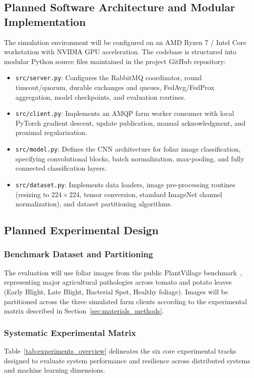 \documentclass[applsci,article,submit,oneauthor,pdftex]{Definitions/mdpi}
\begin{document}
\subsection{Planned Software Architecture and Modular Implementation}
The simulation environment will be configured on an AMD Ryzen 7 / Intel Core workstation with NVIDIA GPU acceleration. The codebase is structured into modular Python source files maintained in the project GitHub repository:
\begin{itemize}[leftmargin=*]
    \item \texttt{src/server.py}: Configures the RabbitMQ coordinator, round timeout/quorum, durable exchanges and queues, FedAvg/FedProx aggregation, model checkpoints, and evaluation routines.
    \item \texttt{src/client.py}: Implements an AMQP farm worker consumer with local PyTorch gradient descent, update publication, manual acknowledgment, and proximal regularization.
    \item \texttt{src/model.py}: Defines the CNN architecture for foliar image classification, specifying convolutional blocks, batch normalization, max-pooling, and fully connected classification layers.
    \item \texttt{src/dataset.py}: Implements data loaders, image pre-processing routines (resizing to $224 \times 224$, tensor conversion, standard ImageNet channel normalization), and dataset partitioning algorithms.
\end{itemize}

\subsection{Planned Experimental Design}

\subsubsection{Benchmark Dataset and Partitioning}
The evaluation will use foliar images from the public PlantVillage benchmark~\cite{mohanty2016using}, representing major agricultural pathologies across tomato and potato leaves (Early Blight, Late Blight, Bacterial Spot, Healthy foliage). Images will be partitioned across the three simulated farm clients according to the experimental matrix described in Section~\ref{sec:materials_methods}.

\subsubsection{Systematic Experimental Matrix}
Table~\ref{tab:experiments_overview} delineates the six core experimental tracks designed to evaluate system performance and resilience across distributed systems and machine learning dimensions.
\end{document}
